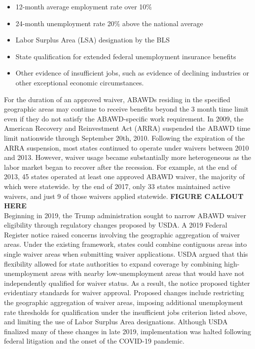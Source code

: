 \documentclass[12pt]{article}
\begin{document}
\begin{itemize}
    \item 12-month average employment rate over 10\%
    \item 24-month unemployment rate 20\% above the national average
    \item Labor Surplus Area (LSA) designation by the BLS
    \item State qualification for extended federal unemployment insurance benefits
    \item Other evidence of insufficient jobs, such as evidence of declining industries or other exceptional economic circumstances.
\end{itemize}

For the duration of an approved waiver, ABAWDs residing in the specified geographic areas may continue to receive benefits beyond the 3 month time limit even if they do not satisfy the ABAWD-specific work requirement. In 2009, the American Recovery and Reinvestment Act (ARRA) suspended the ABAWD time limit nationwide through September 20th, 2010. Following the expiration of the ARRA suspension, most states continued to operate under waivers between 2010 and 2013. However, waiver usage became substantially more heterogeneous as the labor market began to recover after the recession. For example, at the end of 2013, 45 states operated at least one approved ABAWD waiver, the majority of which were statewide. by the end of 2017, only 33 states maintained active waivers, and just 9 of those waivers applied statewide. \textbf{FIGURE CALLOUT HERE}\\

Beginning in 2019, the Trump administration sought to narrow ABAWD waiver eligibility through regulatory changes proposed by USDA. A 2019 Federal Register notice raised concerns involving the geographic aggregation of waiver areas. Under the existing framework, states could combine contiguous areas into single waiver areas when submitting waiver applications. USDA argued that this flexibility allowed for state authorities to expand coverage by combining high-unemployment areas with nearby low-unemployment areas that would have not independently qualified for waiver status. As a result, the notice proposed tighter evidentiary standards for waiver approval. Proposed changes include restricting the geographic aggregation of waiver areas, imposing additional unemployment rate thresholds for qualification under the insufficient jobs criterion listed above, and limiting the use of Labor Surplus Area designations. Although USDA finalized many of these changes in late 2019, implementation was halted following federal litigation and the onset of the COVID-19 pandemic.
\end{document}
